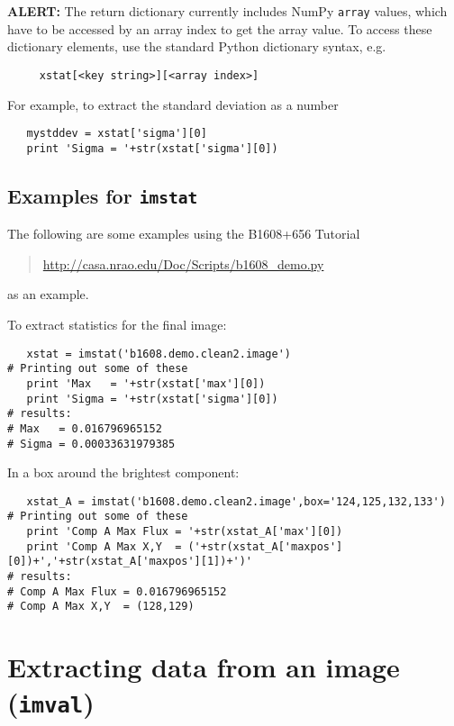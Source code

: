 {\bf ALERT:} The return dictionary currently includes 
NumPy {\tt array} values, which have to be accessed by
an array index to get the array value.
To access these dictionary elements, use the standard Python
dictionary syntax, e.g.
\small
\begin{verbatim}
     xstat[<key string>][<array index>]
\end{verbatim}
\normalsize
For example, to extract the standard deviation as a number
\small
\begin{verbatim}
   mystddev = xstat['sigma'][0]
   print 'Sigma = '+str(xstat['sigma'][0])
\end{verbatim}
\normalsize

\subsection{Examples for {\tt imstat}}
\label{section:analysis.imstat.examples}

The following are some examples using the B1608+656 Tutorial
\begin{quote}
  \url{http://casa.nrao.edu/Doc/Scripts/b1608_demo.py}
\end{quote}
as an example.

To extract statistics for the final image:
\small
\begin{verbatim}
   xstat = imstat('b1608.demo.clean2.image')
# Printing out some of these
   print 'Max   = '+str(xstat['max'][0])
   print 'Sigma = '+str(xstat['sigma'][0])
# results:
# Max   = 0.016796965152
# Sigma = 0.00033631979385
\end{verbatim}
\normalsize

In a box around the brightest component:
\small
\begin{verbatim}
   xstat_A = imstat('b1608.demo.clean2.image',box='124,125,132,133')
# Printing out some of these
   print 'Comp A Max Flux = '+str(xstat_A['max'][0])
   print 'Comp A Max X,Y  = ('+str(xstat_A['maxpos'][0])+','+str(xstat_A['maxpos'][1])+')'
# results:
# Comp A Max Flux = 0.016796965152
# Comp A Max X,Y  = (128,129)
\end{verbatim}
\normalsize

\section{Extracting data from an image ({\tt imval})}
\label{section:analysis.imval}


